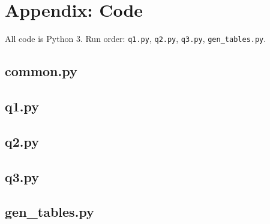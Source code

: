 \documentclass[10pt]{article}
\begin{document}
\clearpage
\appendix
\section*{Appendix: Code}
All code is Python 3. Run order: \texttt{q1.py}, \texttt{q2.py}, \texttt{q3.py}, \texttt{gen\_tables.py}.
\subsection*{common.py}
\subsection*{q1.py}
\subsection*{q2.py}
\subsection*{q3.py}
\subsection*{gen\_tables.py}
\end{document}
